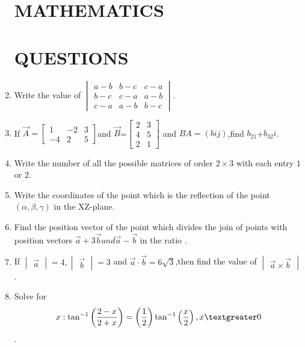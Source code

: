 \documentclass[12pt, letterpaper]{article}
\begin{document}
\begin{enumerate}
\providecommand{\mydet}[1]{\ensuremath{\begin{vmatrix}#1\end{vmatrix}}}
\providecommand{\myvec}[1]{\ensuremath{\begin{bmatrix}#1\end{bmatrix}}}
\providecommand{\cbrak}[1]{\ensuremath{\left\{#1\right\}}}
\providecommand{\brak}[1]{\ensuremath{\left(#1\right)}}

\section*{\centering MATHEMATICS}
		\section*{\centering QUESTIONS}
	\item Write the value of $\mydet{a-b&b-c&c-a\\b-c&c-a&a-b\\c-a&a-b&b-c}$.

	\item If $\vec{A}=\myvec{1&-2&3\\-4&2&5}$and $\vec{B}$=$\myvec{2&3\\4&5\\2&1}$ and $BA=\brak{bij}$,find $b_{21}$+$b_{32}i$.

\item Write the number of all the possible matrices of order $2\times3$ with each entry $1$ or $2$.

\item Write the coordinates of the point which is the reflection of the point $(\alpha,\beta,\gamma)$ in the XZ-plane.

\item Find the position vector of the point which divides the join of points with position vectors $\vec{a}+3\vec{b} and \vec{a}-\vec{b}$ in the ratio .

\item If $\mydet{\vec{a}}=4,\mydet{\vec{b}}=3$ and $\vec{a}\cdot\vec{b}=6\sqrt{3}$,then find the value of $\mydet{\vec{a}\times\vec{b}}$.

\item Solve for \begin{align} x:\tan^{-1}\brak{\frac{2-x}{2+x}}=\brak{\frac{1}{2}}\tan^{-1}\brak{\frac{x}{2}},x \textgreater 0\end{align}.
	

\end{enumerate}
\end{document}
